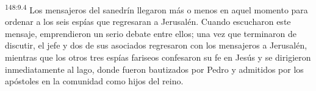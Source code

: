 \par 
\textsuperscript{148:9.4} Los mensajeros del sanedrín llegaron más o menos en aquel momento para ordenar a los seis espías que regresaran a Jerusalén. Cuando escucharon este mensaje, emprendieron un serio debate entre ellos; una vez que terminaron de discutir, el jefe y dos de sus asociados regresaron con los mensajeros a Jerusalén, mientras que los otros tres espías fariseos confesaron su fe en Jesús y se dirigieron inmediatamente al lago, donde fueron bautizados por Pedro y admitidos por los apóstoles en la comunidad como hijos del reino.